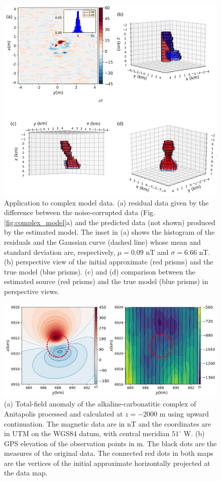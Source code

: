 \begin{figure}
    \centering
    \includegraphics[scale=.5]{figures/complex_results.png}
    \caption{Application to complex model data. (a) residual data given by the difference between the noise-corrupted data (Fig. \ref{fig:complex_model}a) and the predicted data (not shown) produced by the estimated model. The inset in (a) shows the histogram of the residuals and the Gaussian curve (dashed line) whose mean and standard deviation are, respectively, $\mu = 0.09$ nT and $\sigma=6.66$ nT. (b) perspective view of the initial approximate (red prisms) and the true model (blue prisms). (c) and (d) comparison between the estimated source (red prisms) and the true model (blue prisms) in perspective views. 
}
    \label{fig:complex_result}
\end{figure}


\begin{figure}
    \centering
    \includegraphics[scale=.5]{figures/real_updata.png}
    \caption{(a) Total-field anomaly of the alkaline-carbonatitic complex of Anitapolis processed and calculated at $z=-2000$ m using upward continuation. The magnetic data are in nT and the coordinates are in UTM on the WGS84 datum, with central meridian $ 51^\circ $ W. (b) GPS elevation of the observation points in m. The black dots are the measures of the original data. The connected red dots in both maps are the vertices of the initial approximate horizontally projected at the data map.
}
    \label{fig:real_data}
\end{figure}

